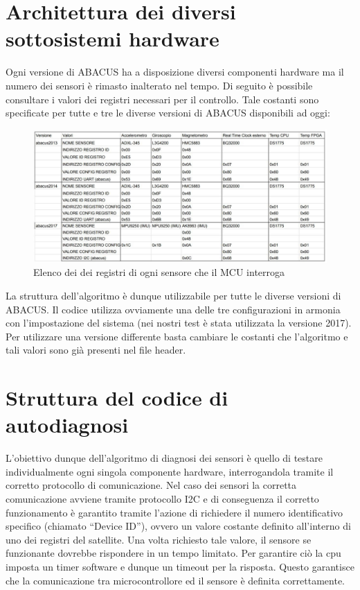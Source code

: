 \documentclass[LaM,binding=0.6cm,oneside]{../sapthesis}
\begin{document}
\section{Architettura dei diversi sottosistemi hardware}



Ogni versione di ABACUS ha a disposizione diversi componenti hardware ma il numero dei sensori è rimasto inalterato nel tempo.
Di seguito è possibile consultare i valori dei registri necessari per il controllo. Tale costanti sono specificate per tutte e tre le diverse versioni di ABACUS disponibili ad oggi:

\begin{figure}[htbp]
\centerline{\includegraphics[scale=0.55]{examples/registerMapSensori.PNG}}
\caption{Elenco dei dei registri di ogni sensore che il MCU interroga}
\label{fig}
\end{figure}
\vspace{0.5cm}

La struttura dell'algoritmo è dunque utilizzabile per tutte le diverse versioni di ABACUS.
Il codice utilizza ovviamente una delle tre configurazioni in armonia con l'impostazione del sistema (nei nostri test è stata utilizzata la versione 2017). Per utilizzare una versione differente basta cambiare le costanti che l'algoritmo e tali valori sono già presenti nel file header.


\section{Struttura del codice di autodiagnosi}

L’obiettivo dunque dell’algoritmo di diagnosi dei sensori è quello di testare individualmente ogni singola componente hardware, interrogandola tramite il corretto protocollo di comunicazione.
Nel caso dei sensori la corretta comunicazione avviene tramite protocollo I2C e di conseguenza il corretto funzionamento è garantito tramite l’azione di richiedere il numero identificativo specifico (chiamato “Device ID”), ovvero un valore costante definito all’interno di uno dei registri del satellite. Una volta richiesto tale valore, il sensore se funzionante dovrebbe rispondere in un tempo limitato. Per garantire ciò la cpu imposta un timer software e dunque un timeout per la risposta. Questo garantisce che la comunicazione tra microcontrollore ed il sensore è definita correttamente.
\end{document}
